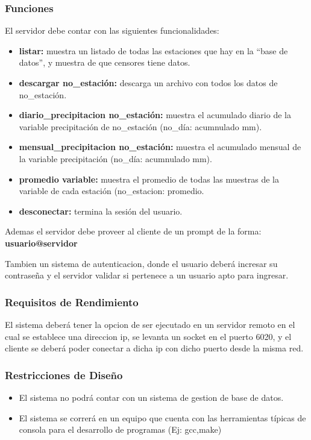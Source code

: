 \documentclass[10pt, a4paper,notitlepage]{article}
\begin{document}
\subsubsection{Funciones}
El servidor debe contar con las siguientes funcionalidades:
\begin{itemize}
	\item \textbf{listar:} muestra un listado de todas las estaciones que hay en la “base de datos”,
	y muestra de que censores tiene datos.
	\item \textbf{descargar no\_estación:} descarga un archivo con todos los datos de
	no\_estación.
	\item \textbf{diario\_precipitacion no\_estación:} muestra el acumulado diario de la variable
	precipitación de no\_estación (no\_día: acumnulado mm).
	\item\textbf{ mensual\_precipitacion no\_estación:} muestra el acumulado mensual de la
	variable precipitación (no\_día: acumnulado mm).
	\item \textbf{promedio variable:} muestra el promedio de todas las muestras de la variable
	de cada estación (no\_estacion: promedio.
	\item \textbf{desconectar:} termina la sesión del usuario.
\end{itemize}

Ademas el servidor debe proveer al cliente de un prompt de la forma:
\textbf{usuario@servidor}

Tambien un sistema de autenticacion, donde el usuario deberá incresar su contraseña y el servidor validar si pertenece a un usuario apto para ingresar.
\subsubsection{Requisitos de Rendimiento}
El sistema deberá tener la opcion de ser ejecutado en un servidor remoto en el cual se establece una direccion ip, se levanta un socket en el puerto 6020, y el cliente se deberá poder conectar a dicha ip con dicho puerto desde la misma red.
\subsubsection{Restricciones de Diseño}
\begin{itemize}
	\item El sistema no podrá contar con un sistema de gestion de base de datos.
	\item El sistema se correrá en un equipo que cuenta con las herramientas típicas de consola para el desarrollo de programas (Ej: gcc,make)
\end{itemize}
\end{document}
